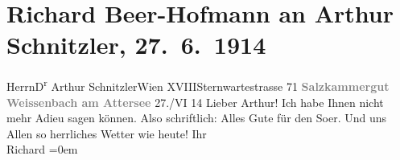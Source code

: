 

         \renewcommand{\erwaehnteOrte}{Orte: Salzkammergut, Sternwartestraße, Weißenbach am Attersee, Wien, XVIII., Währing}
         \renewcommand{\erwaehnteWerke}{}
               \section[Richard Beer-Hofmann an Arthur Schnitzler, 27. 6. 1914]{ Richard Beer-Hofmann an Arthur Schnitzler, 27. 6. 1914}\nopagebreak{}\rehead{ }\begin{ledgroupsized}[t]{13cm}\normalsize\beginnumbering \toendnotes[C]{\smallbreak\pagebreak[2]} 
\pstart{}{\pb}Herrn\pend{}\pstart{}D\textsuperscript{r} Arthur Schnitzler\pend{}\pstart{}Wien XVIII\pend{}\pstart{}Sternwartestrasse 71\pend{}{\bigskip}\pstart
           \noindent{}\centering{}{\pb}\textcolor{gray}{\textbf{Salzkammergut}}\pend
           \pstart
           \noindent{}\centering{}\textcolor{gray}{\textbf{Weissenbach am Attersee}}\pend
           \pstart
           \raggedleft{}{\pb}27./VI 14\pend
           \pstart{}Lieber Arthur!\pend\pstart
           Ich habe Ihnen nicht mehr Adieu sagen können.\pend
           \pstart
           Also schriftlich: Alles Gute für den So{\geminationm}er. Und uns
               Allen so herrliches Wetter wie heute!\pend
           \pstart
           Ihr{\\[\baselineskip]}\spacefill\mbox{Richard}\pend
           \leftskip=0em{}
         
         \endnumbering{}\end{ledgroupsized}  \newcommand{\dateiname}{L02184}\newcommand{\titel}{Richard Beer-Hofmann an Arthur Schnitzler, 27. 6. 1914}\newcommand{\editorInnen}{Martin Anton Müller und Gerd-Hermann Susen}
      